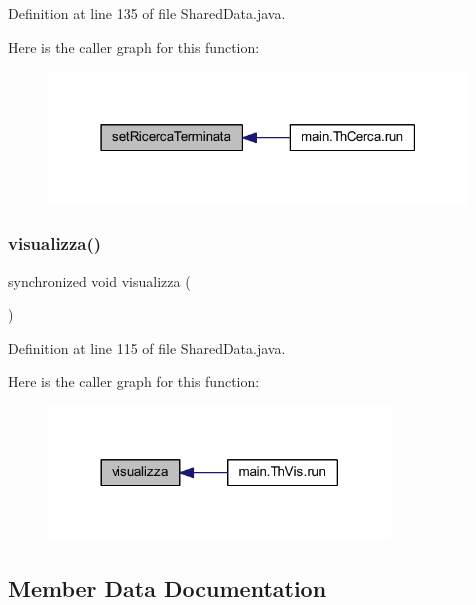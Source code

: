 Definition at line 135 of file Shared\+Data.\+java.

Here is the caller graph for this function\+:
\nopagebreak
\begin{figure}[H]
\begin{center}
\leavevmode
\includegraphics[width=315pt]{classmain_1_1_shared_data_a8fb1402b905776d228577eee7cdb826f_icgraph}
\end{center}
\end{figure}
\mbox{\label{classmain_1_1_shared_data_a0e899cc4037a80b857974e1b46c208bf}} 
\subsubsection{\texorpdfstring{visualizza()}{visualizza()}}
{\footnotesize\ttfamily synchronized void visualizza (\begin{DoxyParamCaption}{ }\end{DoxyParamCaption})}



Definition at line 115 of file Shared\+Data.\+java.

Here is the caller graph for this function\+:
\nopagebreak
\begin{figure}[H]
\begin{center}
\leavevmode
\includegraphics[width=257pt]{classmain_1_1_shared_data_a0e899cc4037a80b857974e1b46c208bf_icgraph}
\end{center}
\end{figure}


\subsection{Member Data Documentation}
\mbox{\label{classmain_1_1_shared_data_a8317b33b8c004741d95935199d964be9}} 

